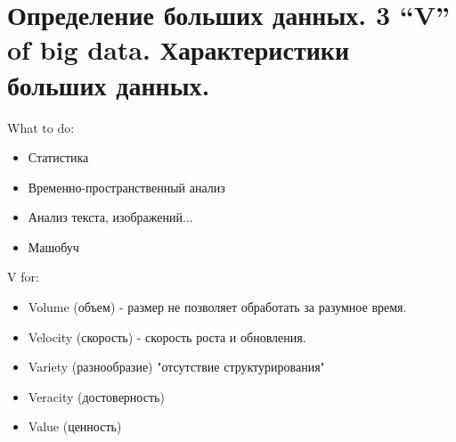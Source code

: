 \section{Определение больших данных. 3 “V” of big data. Характеристики больших данных.}


What to do:
\begin{itemize}
    \item Статистика
    \item Временно-пространственный анализ
    \item Анализ текста, изображений...
    \item Машобуч
\end{itemize}

V for:
\begin{itemize}
    \item Volume (объем) - размер не позволяет обработать за разумное
    время.
    \item Velocity (скорость) - скорость роста и обновления.
    \item Variety (разнообразие) "отсутствие структурирования"
    \item Veracity (достоверность)
    \item Value (ценность)
\end{itemize}
